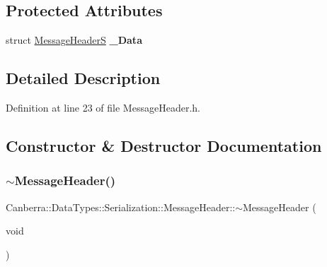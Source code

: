 \subsection*{Protected Attributes}
\begin{DoxyCompactItemize}
\item 
\mbox{\label{class_canberra_1_1_data_types_1_1_serialization_1_1_message_header_aa11672975bfddfa22618a273c1bfe371}} 
struct \hyperlink{struct_message_header_s}{Message\+HeaderS} {\bfseries \+\_\+\+Data}
\end{DoxyCompactItemize}


\subsection{Detailed Description}


Definition at line 23 of file Message\+Header.\+h.



\subsection{Constructor \& Destructor Documentation}
\mbox{\label{class_canberra_1_1_data_types_1_1_serialization_1_1_message_header_aa2a70c41a1faa824a497842935c4e8dc_aa2a70c41a1faa824a497842935c4e8dc}} 
\subsubsection{\texorpdfstring{$\sim$\+Message\+Header()}{~MessageHeader()}}
{\footnotesize\ttfamily Canberra\+::\+Data\+Types\+::\+Serialization\+::\+Message\+Header\+::$\sim$\+Message\+Header (\begin{DoxyParamCaption}\item[{void}]{ }\end{DoxyParamCaption})\hspace{0.3cm}{\ttfamily [virtual]}}

